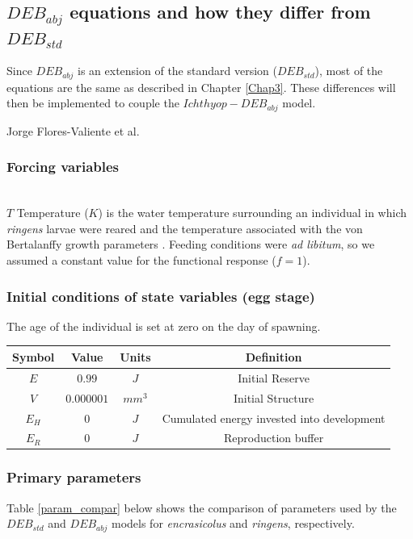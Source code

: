 \subsection{\textbf{$DEB_{abj}$} equations and how they differ from \textbf{$DEB_{std}$}}

Since $DEB_{abj}$ is an extension of the standard version ($DEB_{std}$), most of the equations are the same as described in Chapter \ref{Chap3}. These differences will then be implemented to couple the $Ichthyop-DEB_{abj}$ model.

Jorge Flores-Valiente et al.\\

\subsubsection{Forcing variables}\label{Chap4ForVar}
\hfill \\

$T$ Temperature ($K$) is the water temperature surrounding an individual in which \textit{\gls{ringens}} larvae were reared \citep{RiouOfel2021} and the temperature associated with the von Bertalanffy growth parameters \citep{PaloMuck1987}. Feeding conditions were \textit{ad libitum}, so we assumed a constant value for the functional response ($f = 1$).\\

\subsubsection{Initial conditions of state variables (egg stage)}\label{Chap4InitCond}

The age of the individual is set at zero on the day of spawning.\\

\begin{tabular}{|c|c|c|c|}
\hline 
Symbol  & Value      & Units  & Definition      \\ 
\hline 
$E$     & $0.99$     & $J$    & Initial Reserve \\ 
$V$     & $0.000001$ & $mm^3$ & Initial Structure\\
$E_{H}$ & $0$ 		  & $J$    & Cumulated energy invested into development\\
$E_{R}$ & $0$         & $J$   & Reproduction buffer\\
\hline 
\end{tabular}

\subsubsection{Primary parameters}\label{Chap4PriPar}
Table \ref{param_compar} below shows the comparison of parameters used by the $DEB_{std}$ and $DEB_{abj}$ models for \textit{\gls{encrasicolus}} and \textit{\gls{ringens}}, respectively.

